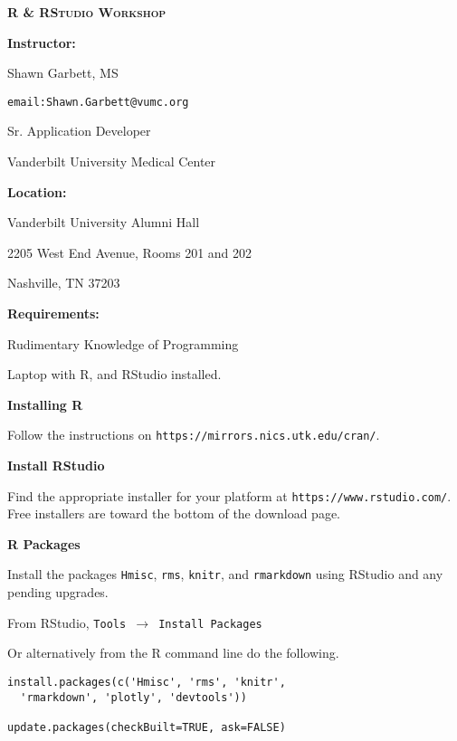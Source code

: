 \documentclass[twocolumn]{article}
\begin{document}
\textbf{\LARGE{\textsc{R \& RStudio Workshop}}}


\vspace*{\fill}

\begin{flushleft}

\textbf{Instructor:}

Shawn Garbett, MS

\texttt{email:Shawn.Garbett@vumc.org}

Sr. Application Developer

Vanderbilt University Medical Center
\end{flushleft}

\vspace*{\fill}

\begin{flushleft}
\textbf{Location:}

Vanderbilt University Alumni Hall

2205 West End Avenue, Rooms 201 and 202

Nashville, TN 37203
\end{flushleft}

\vspace*{\fill}

\begin{flushleft}

\textbf{Requirements:}

Rudimentary Knowledge of Programming

Laptop with R, and RStudio installed.

\end{flushleft}

\vspace*{\fill}

\begin{flushleft}

\textbf{Installing R}

Follow the instructions on \texttt{https://mirrors.nics.utk.edu/cran/}.

\textbf{Install RStudio}

Find the appropriate installer for your platform at \texttt{https://www.rstudio.com/}. Free installers are toward the bottom of the download page.

\textbf{R Packages}

Install the packages \texttt{Hmisc}, \texttt{rms}, \texttt{knitr}, and \texttt{rmarkdown} using RStudio and any pending upgrades.

From RStudio, \texttt{Tools $\rightarrow$ Install Packages}

Or alternatively from the R command line do the following.

\begin{framed}
\begin{verbatim}
install.packages(c('Hmisc', 'rms', 'knitr',
  'rmarkdown', 'plotly', 'devtools'))
  
update.packages(checkBuilt=TRUE, ask=FALSE)
\end{verbatim}
\end{framed}

\end{flushleft}
\end{document}
